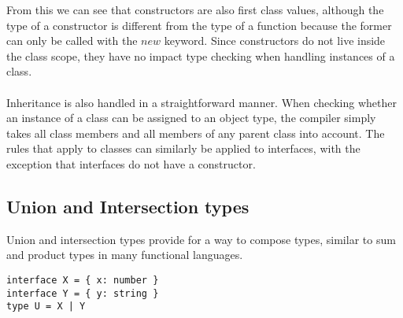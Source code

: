 From this we can see that constructors are also first class values,
although the type of a constructor is different from the type of a function because the former can only be called with the $new$ keyword.
Since constructors do not live inside the class scope, they have no impact type checking when handling instances of a class.
\\
\\
Inheritance is also handled in a straightforward manner.
When checking whether an instance of a class can be assigned to an object type, the compiler
simply takes all class members and all members of any parent class into account.
The rules that apply to classes can similarly be applied to interfaces, with the exception that interfaces do not have a constructor.

\subsection{Union and Intersection types}
Union and intersection types provide for a way to compose types, similar to sum and product types in many functional languages.
\begin{lstlisting}
interface X = { x: number }
interface Y = { y: string }
type U = X | Y
\end{lstlisting}

